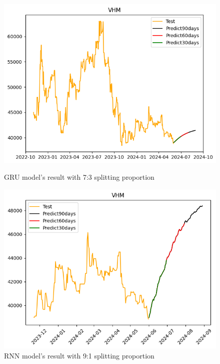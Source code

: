 \documentclass{ieeeojies}
\begin{document}
  \begin{figure}[H]
    \centering
    \begin{minipage}{0.23\textwidth}
    \centering
    \includegraphics[width=1\textwidth]{bibliography/Figure/VHMGRU_7-3.png}
    \caption{GRU model's result with 7:3 splitting proportion}
    \label{fig:1}
    \end{minipage}
    \hfill
    \begin{minipage}{0.23\textwidth}
    \centering
    \includegraphics[width=1\textwidth]{bibliography/Figure/VHMRNN_9-1.png}
    \caption{RNN model's result with 9:1 splitting proportion}
    \label{fig:2}
    \end{minipage}
  \end{figure}
\end{document}
